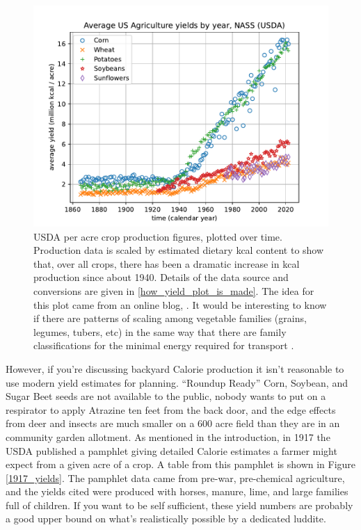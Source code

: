 \documentclass[12pt]{iopart}
\begin{document}
\begin{figure}[ht!]
\centering
\includegraphics[width=\columnwidth]{kcal_per_acre_yields.pdf}
\caption{
USDA per acre crop production figures, plotted over time.  Production data is scaled by estimated dietary kcal content to show that, over all crops, there has been a dramatic increase in kcal production since about 1940.  
Details of the data source and conversions are given in \ref{how_yield_plot_is_made}.
The idea for this plot came from an online blog, \cite{math_encounters}.  
It would be interesting to know if there are patterns of scaling among vegetable families (grains, legumes, tubers, etc) in the same way that there are family classifications for the minimal energy required for transport \cite{energetic_cost_of_moving}.
}
\label{ag_yields}
\end{figure}

However, if you're discussing backyard Calorie production it isn't reasonable to use modern yield estimates for planning.  ``Roundup Ready'' Corn, Soybean, and Sugar Beet seeds are not available to the public, nobody wants to put on a respirator to apply Atrazine ten feet from the back door,  and the edge effects from deer and insects are much smaller on a $600$ acre field than they are in an community garden allotment.  As mentioned in the introduction, in 1917 the USDA published a pamphlet \cite{USDA_1917_yields_pamphlet} giving detailed Calorie estimates a farmer might expect from a given acre of a crop.  A table from this pamphlet is shown in Figure \ref{1917_yields}.  
The pamphlet data came from pre-war, pre-chemical agriculture, and the yields cited were produced with horses, manure, lime, and large families full of children.  If you want to be self sufficient, these yield numbers are probably a good upper bound on what's realistically possible by a dedicated luddite.  
\end{document}

